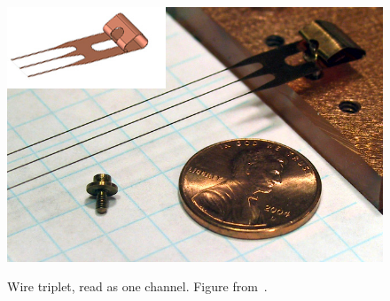 \begin{figure}
\begin{center}
\includegraphics[keepaspectratio=true,width=\textwidth]{triplet.jpg}
\end{center}
\renewcommand{\baselinestretch}{1}
\small\normalsize
\begin{quote}
\caption{Wire triplet, read as one channel.  Figure from~\cite{detectorPartI}.}
\label{fig:WireTriplet}
\end{quote}
\end{figure}
\renewcommand{\baselinestretch}{2}
\small\normalsize

